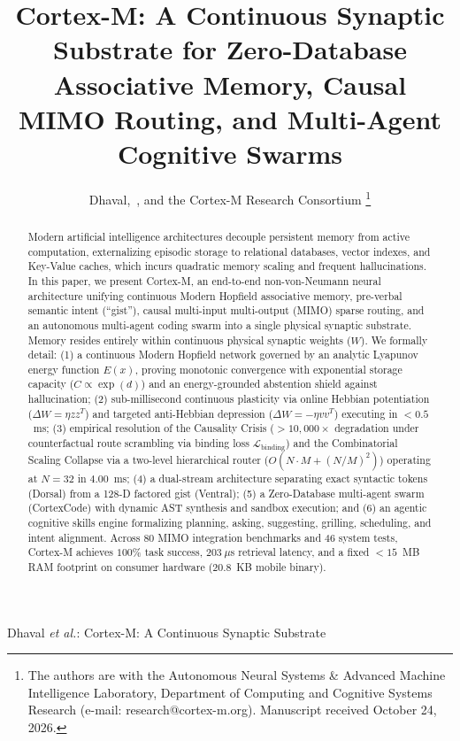 \documentclass[journal]{IEEEtran}
\begin{document}
\title{Cortex-M: A Continuous Synaptic Substrate for Zero-Database Associative Memory, Causal MIMO Routing, and Multi-Agent Cognitive Swarms}

\author{Dhaval,~, and the Cortex-M Research Consortium
\thanks{The authors are with the Autonomous Neural Systems \& Advanced Machine Intelligence Laboratory, Department of Computing and Cognitive Systems Research (e-mail: research@cortex-m.org). Manuscript received October 24, 2026.}}

%
{Dhaval \MakeLowercase{\textit{et al.}}: Cortex-M: A Continuous Synaptic Substrate}

\maketitle

\begin{abstract}
Modern artificial intelligence architectures decouple persistent memory from active computation, externalizing episodic storage to relational databases, vector indexes, and Key-Value caches, which incurs quadratic memory scaling and frequent hallucinations. In this paper, we present Cortex-M, an end-to-end non-von-Neumann neural architecture unifying continuous Modern Hopfield associative memory, pre-verbal semantic intent (``gist''), causal multi-input multi-output (MIMO) sparse routing, and an autonomous multi-agent coding swarm into a single physical synaptic substrate. Memory resides entirely within continuous physical synaptic weights ($W$). We formally detail: (1) a continuous Modern Hopfield network governed by an analytic Lyapunov energy function $E(x)$, proving monotonic convergence with exponential storage capacity ($C \propto \exp(d)$) and an energy-grounded abstention shield against hallucination; (2) sub-millisecond continuous plasticity via online Hebbian potentiation ($\Delta W = \eta z z^T$) and targeted anti-Hebbian depression ($\Delta W = -\eta v v^T$) executing in $<0.5$~ms; (3) empirical resolution of the Causality Crisis ($>10,000\times$ degradation under counterfactual route scrambling via binding loss $\mathcal{L}_{\text{binding}}$) and the Combinatorial Scaling Collapse via a two-level hierarchical router ($O(N \cdot M + (N/M)^2)$) operating at $N=32$ in $4.00$~ms; (4) a dual-stream architecture separating exact syntactic tokens (Dorsal) from a 128-D factored gist (Ventral); (5) a Zero-Database multi-agent swarm (CortexCode) with dynamic AST synthesis and sandbox execution; and (6) an agentic cognitive skills engine formalizing planning, asking, suggesting, grilling, scheduling, and intent alignment. Across 80 MIMO integration benchmarks and 46 system tests, Cortex-M achieves $100\%$ task success, $203~\mu$s retrieval latency, and a fixed $<15$~MB RAM footprint on consumer hardware ($20.8$~KB mobile binary).
\end{abstract}
\end{document}
